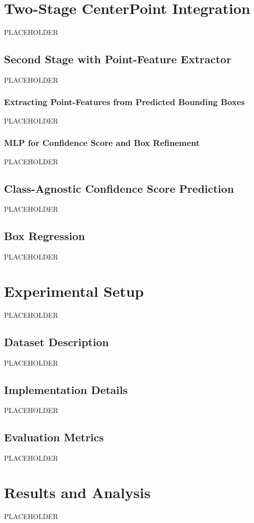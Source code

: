 \documentclass[twocolumn, times]{article}
\begin{document}
\section{Two-Stage CenterPoint Integration}
PLACEHOLDER

\subsection{Second Stage with Point-Feature Extractor}
PLACEHOLDER

\subsubsection{Extracting Point-Features from Predicted Bounding Boxes}
PLACEHOLDER

\subsubsection{MLP for Confidence Score and Box Refinement}
PLACEHOLDER

\subsection{Class-Agnostic Confidence Score Prediction}
PLACEHOLDER

\subsection{Box Regression}
PLACEHOLDER

\section{Experimental Setup}
PLACEHOLDER

\subsection{Dataset Description}
PLACEHOLDER

\subsection{Implementation Details}
PLACEHOLDER

\subsection{Evaluation Metrics}
PLACEHOLDER

\section{Results and Analysis}
PLACEHOLDER
\end{document}
